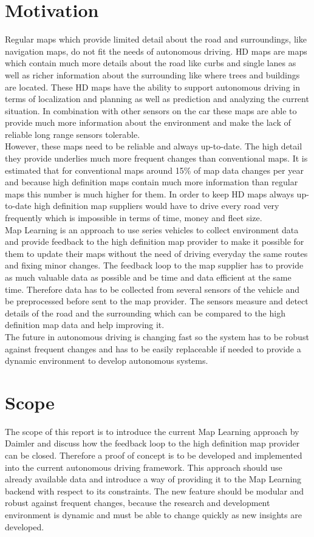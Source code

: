 \section{Motivation}
Regular maps which provide limited detail about the road and surroundings, like navigation maps, do not fit the needs of autonomous driving. \ac{HD} maps are maps which contain much more details about the road like curbs and single lanes as well as richer information about the surrounding like where trees and buildings are located. These HD maps have the ability to support autonomous driving in terms of localization and planning as well as prediction and analyzing the current situation. In combination with other sensors on the car these maps are able to provide much more information about the environment and make the lack of reliable long range sensors tolerable.\\
However, these maps need to be reliable and always up-to-date. The high detail they provide underlies much more frequent changes than conventional maps. It is estimated that for conventional maps around 15\% of map data changes per year \cite{tomtom} and because high definition maps contain much more information than regular maps this number is much higher for them. In order to keep HD maps always up-to-date high definition map suppliers would have to drive every road very frequently which is impossible in terms of time, money and fleet size.\\
Map Learning is an approach to use series vehicles to collect environment data and provide feedback to the high definition map provider to make it possible for them to update their maps without the need of driving everyday the same routes and fixing minor changes. The feedback loop to the map supplier has to provide as much valuable data as possible and be time and data efficient at the same time. Therefore data has to be collected from several sensors of the vehicle and be preprocessed before sent to the map provider. The sensors measure and detect details of the road and the surrounding which can be compared to the high definition map data and help improving it.\\
The future in autonomous driving is changing fast so the system has to be robust against frequent changes and has to be easily replaceable if needed to provide a dynamic environment to develop autonomous systems. 
\section{Scope}
The scope of this report is to introduce the current Map Learning approach by Daimler and discuss how the feedback loop to the high definition map provider can be closed. Therefore a proof of concept is to be developed and implemented into the current autonomous driving framework. This approach should use already available data and introduce a way of providing it to the Map Learning backend with respect to its constraints. The new feature should be modular and robust against frequent changes, because the research and development environment is dynamic and must be able to change quickly as new insights are developed. 